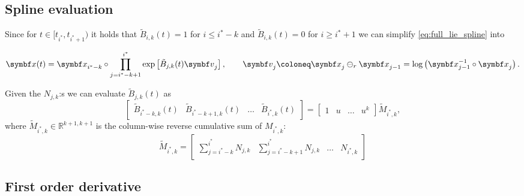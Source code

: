 \subsection{Spline evaluation}

Since for $t \in [t_{i^*}, t_{i^*+1})$ it holds that $\tilde B_{i, k}(t) = 1$ for $i \leq i^* - k$ and $\tilde B_{i, k}(t) = 0$ for $i \geq i^* + 1$ we can simplify \eqref{eq:full_lie_spline} into
\begin{important}
  \begin{equation}
    \label{eq:simple_lie_spline}
    \x(t) = \x_{i^* - k} \circ \prod_{j=i^* - k + 1}^{i^*} \exp \left[ \tilde B_{j, k} (t) \bv_j \right], \qquad \bv_j \coloneq \x_j \ominus_r \x_{j-1} = \log \left( \x_{j-1}^{-1} \circ \x_j \right).
  \end{equation}
\end{important}
Given the $N_{j, k}$:s we can evaluate $\tilde B_{j, k}(t)$ as
\begin{equation}
  \begin{bmatrix} \tilde B_{i^* - k, k}(t) & \tilde B_{i^* - k+1, k}(t) & \hdots & \tilde B_{i^*, k}(t) \end{bmatrix}  = \begin{bmatrix} 1 & u & \hdots & u^k \end{bmatrix} \tilde M_{i^*, k},
\end{equation}
where $\tilde M_{i^*, k} \in \mathbb{R}^{k+1, k+1}$ is the column-wise reverse cumulative sum of $M_{i^*,k}$:
\begin{equation}
  \label{eq:cumulative_coeff_matrix}
  \tilde M_{i^*, k} = \begin{bmatrix} \sum\limits_{j=i^*-k}^{i^*} N_{j,k} & \sum\limits_{j=i^*-k+1}^{i^*} N_{j,k} & \hdots & N_{i^*,k} \end{bmatrix}
\end{equation}

\subsection{First order derivative}

